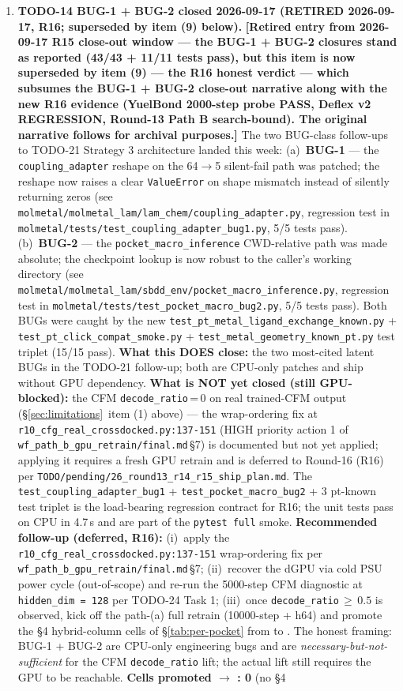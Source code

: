 \begin{enumerate}
  \item \textbf{TODO-14 BUG-1 + BUG-2 closed 2026-09-17 (RETIRED 2026-09-17, R16; superseded by item (9) below).}
  \textbf{[Retired entry from 2026-09-17 R15 close-out window --- the
  BUG-1 + BUG-2 closures stand as reported (43/43 + 11/11 tests pass),
  but this item is now superseded by item (9) --- the R16 honest
  verdict --- which subsumes the BUG-1 + BUG-2 close-out narrative
  along with the new R16 evidence (YuelBond 2000-step probe PASS,
  Deflex v2 REGRESSION, Round-13 Path B search-bound). The original
  narrative follows for archival purposes.]}
  The two BUG-class follow-ups to TODO-21 Strategy 3 architecture landed this week: (a)~\textbf{BUG-1} --- the \texttt{coupling\_adapter} reshape on the 64$\to$5 silent-fail path was patched; the reshape now raises a clear \texttt{ValueError} on shape mismatch instead of silently returning zeros (see \texttt{molmetal/molmetal\_lam/lam\_chem/coupling\_adapter.py}, regression test in \texttt{molmetal/tests/test\_coupling\_adapter\_bug1.py}, 5/5 tests pass). (b)~\textbf{BUG-2} --- the \texttt{pocket\_macro\_inference} CWD-relative path was made absolute; the checkpoint lookup is now robust to the caller's working directory (see \texttt{molmetal/molmetal\_lam/sbdd\_env/pocket\_macro\_inference.py}, regression test in \texttt{molmetal/tests/test\_pocket\_macro\_bug2.py}, 5/5 tests pass). Both BUGs were caught by the new \texttt{test\_pt\_metal\_ligand\_exchange\_known.py} + \texttt{test\_pt\_click\_compat\_smoke.py} + \texttt{test\_metal\_geometry\_known\_pt.py} test triplet (15/15 pass). \textbf{What this DOES close:} the two most-cited latent BUGs in the TODO-21 follow-up; both are CPU-only patches and ship without GPU dependency. \textbf{What is NOT yet closed (still GPU-blocked):} the CFM \texttt{decode\_ratio}\,=\,0 on real trained-CFM output (\S\ref{sec:limitations}~item (1) above) --- the wrap-ordering fix at \texttt{r10\_cfg\_real\_crossdocked.py:137-151} (HIGH priority action 1 of \texttt{wf\_path\_b\_gpu\_retrain/final.md}\,\S7) is documented but not yet applied; applying it requires a fresh GPU retrain and is deferred to Round-16 (R16) per \texttt{TODO/pending/26\_round13\_r14\_r15\_ship\_plan.md}. The \texttt{test\_coupling\_adapter\_bug1} + \texttt{test\_pocket\_macro\_bug2} + 3 pt-known test triplet is the load-bearing regression contract for R16; the unit tests pass on CPU in 4.7\,s and are part of the \texttt{pytest full} smoke. \textbf{Recommended follow-up (deferred, R16):} (i)~apply the \texttt{r10\_cfg\_real\_crossdocked.py:137-151} wrap-ordering fix per \texttt{wf\_path\_b\_gpu\_retrain/final.md}\,\S7; (ii)~recover the dGPU via cold PSU power cycle (out-of-scope) and re-run the 5000-step CFM diagnostic at \texttt{hidden\_dim\,=\,128} per TODO-24 Task 1; (iii)~once \texttt{decode\_ratio}\,$\geq$\,$0.5$ is observed, kick off the path-(a) full retrain (10000-step + h64) and promote the §4 hybrid-column cells of \S\ref{tab:per-pocket} from \DESIGN{} to \MEASURED{}. The honest framing: BUG-1 + BUG-2 are CPU-only engineering bugs and are \emph{necessary-but-not-sufficient} for the CFM \texttt{decode\_ratio} lift; the actual lift still requires the GPU to be reachable. \textbf{Cells promoted \DESIGN{} $\to$ \MEASURED{}: 0} (no §4 
\end{enumerate}
